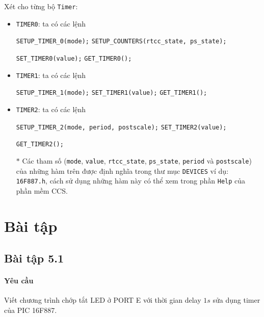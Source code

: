 Xét cho từng bộ \verb|Timer|:
\begin{itemize}
\item \verb|TIMER0|: ta có các lệnh

\verb|SETUP_TIMER_0(mode);| \verb|SETUP_COUNTERS(rtcc_state, ps_state);| 

\verb|SET_TIMER0(value);| \verb|GET_TIMER0();|
\item \verb|TIMER1|: ta có các lệnh 

\verb|SETUP_TIMER_1(mode);| \verb|SET_TIMER1(value);| \verb|GET_TIMER1();|
\item \verb|TIMER2|: ta có các lệnh 

\verb|SETUP_TIMER_2(mode, period, postscale);| \verb|SET_TIMER2(value);| 

\verb|GET_TIMER2();|
\item[$\ast$] Các tham số (\verb|mode|, \verb|value|, \verb|rtcc_state|, \verb|ps_state|, \verb|period| và \verb|postscale|) của những hàm trên được định nghĩa trong thư mục \verb|DEVICES| ví dụ: \verb|16F887.h|, cách sử dụng những hàm này có thể xem trong phần \verb|Help| của phần mềm CCS.
\end{itemize}
\section{Bài tập}
\subsection{Bài tập 5.1}
\paragraph{Yêu cầu}Viết chương trình chớp tắt LED ở PORT E với thời gian delay $1s$ sửa dụng timer của PIC 16F887.

